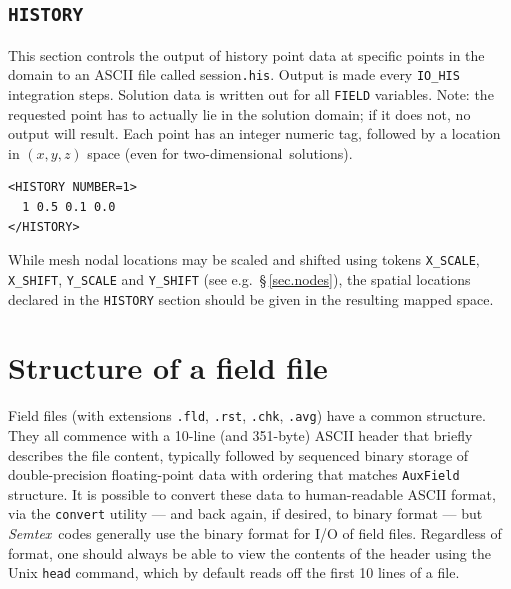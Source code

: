 \documentclass[11pt]{report}
\newcommand{\Semtex}{\emph{Semtex}} \newcommand{\Dog}{\emph{Dog}}
\newcommand\twod{two-di\-men\-sion\-al}
\newcommand{\eg}{e.g.\ } \newcommand{\CC}{\mathrm{c.c.}}
\begin{document}
\subsection{\texttt{HISTORY}}
\label{sec.historyy}

This section controls the output of history point data at specific
points in the domain to an ASCII file called session\verb|.his|.
Output is made every \verb|IO_HIS| integration steps.  Solution data
is written out for all \verb|FIELD| variables.  Note: the requested
point has to actually lie in the solution domain; if it does not, no
output will result. Each point has an integer numeric tag, followed by
a location in $(x,y,z)$ space (even for \twod\ solutions).
%
{\small
\begin{verbatim}
<HISTORY NUMBER=1>
  1	0.5	0.1	0.0
</HISTORY>
\end{verbatim}
}
%
While mesh nodal locations may be scaled and shifted using tokens
\verb|X_SCALE|, \verb|X_SHIFT|, \verb|Y_SCALE| and \verb|Y_SHIFT| (see
\eg \S\,\ref{sec.nodes}), the spatial locations declared in the
\verb|HISTORY| section should be given in the resulting mapped space.

\section{Structure of a field file}
\label{sec.fieldfile}

Field files (with extensions \texttt{.fld}, \texttt{.rst},
\texttt{.chk}, \texttt{.avg}) have a common structure.  They all
commence with a 10-line (and 351-byte) ASCII header that briefly
describes the file content, typically followed by sequenced binary
storage of double-precision floating-point data with ordering that
matches \texttt{AuxField} structure.  It is possible to convert these
data to human-readable ASCII format, via the \texttt{convert} utility
--- and back again, if desired, to binary format --- but
\Semtex\ codes generally use the binary format for I/O of field files.
Regardless of format, one should always be able to view the contents
of the header using the Unix \texttt{head} command, which by default
reads off the first 10 lines of a file.
\end{document}

